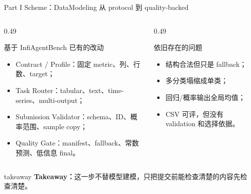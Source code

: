 \documentclass[aspectratio=169,UTF8]{ctexbeamer}
\newcommand{\takeaway}[1]{%
  \vspace{0.35em}
  \begin{beamercolorbox}[wd=\textwidth,sep=0.75ex,rounded=true]{takeaway}
    \textbf{Takeaway：}#1
  \end{beamercolorbox}
}
\begin{document}
\begin{frame}{Part I Scheme：DataModeling 从 protocol 到 quality-backed}
\small
\begin{columns}[T]
\begin{column}{0.49\textwidth}
\begin{block}{基于 InfiAgentBench 已有的改动}
\begin{itemize}
  \item Contract / Profile：固定 metric、列、行数、target；
  \item Task Router：tabular、text、time-series、multi-output；
  \item Submission Validator：schema、ID、概率范围、sample copy；
  \item Quality Gate：manifest、fallback、常数预测、低信息 final。
\end{itemize}
\end{block}
\end{column}
\begin{column}{0.49\textwidth}
\begin{alertblock}{依旧存在的问题}
\begin{itemize}
  \item 结构合法但只是 fallback；
  \item 多分类塌缩成单类；
  \item 回归/概率输出全局均值；
  \item CSV 可评，但没有 validation 和选择依据。
\end{itemize}
\end{alertblock}
\end{column}
\end{columns}
\takeaway{这一步不替模型建模，只把提交前能检查清楚的内容先检查清楚。}
\end{frame}
\end{document}
